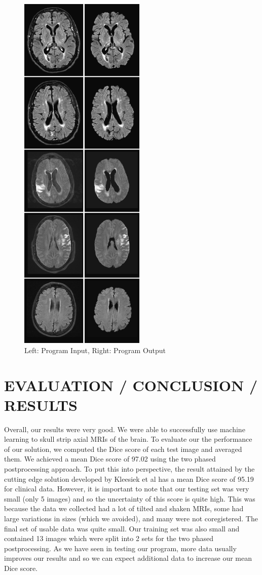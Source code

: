 \documentclass[letterpaper, 10 pt, conference]{ieeeconf}
\begin{document}
\begin{figure}
\centering
\includegraphics[width=6cm]{results.png}
\caption{Left: Program Input, Right: Program Output}
\end{figure}

\section{EVALUATION / CONCLUSION / RESULTS}
Overall, our results were very good. We were able to successfully use machine learning to skull strip axial MRIs of the brain. To evaluate our the performance of our solution, we computed the Dice score of each test image and averaged them. We achieved a mean Dice score of 97.02 using the two phased postprocessing approach. To put this into perspective, the result attained by the cutting edge solution developed by Kleesiek et al has a mean Dice score of 95.19 for clinical data. However, it is important to note that our testing set was very small (only 5 images) and so the uncertainty of this score is quite high. This was because the data we collected had a lot of tilted and shaken MRIs, some had large variations in sizes (which we avoided), and many were not coregistered. The final set of usable data was quite small. Our training set was also small and contained 13 images which were split into 2 sets for the two phased postprocessing. As we have seen in testing our program, more data usually improves our results and so we can expect additional data to increase our mean Dice score.
\end{document}
